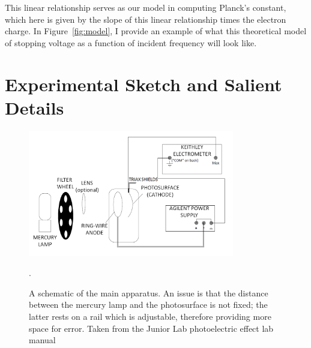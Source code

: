 \documentclass[aps,twocolumn,secnumarabic,balancelastpage,amsmath,amssymb,nofootinbib, floatfix]{revtex4-2}
\begin{document}
This linear relationship serves as our model in computing Planck's constant, which here is given by the slope of this linear relationship times the electron charge. In Figure~\ref{fig:model}, I provide an example of what this theoretical model of stopping voltage as a function of incident frequency will look like. 



\section{Experimental Sketch and Salient Details}

\begin{figure}[H]
	\includegraphics[width=9cm]{apparatus_setup.png}
	\caption{A schematic of the main apparatus. An issue is that the distance between the mercury lamp and the photosurface is not fixed; the latter rests on a rail which is adjustable, therefore providing more space for error. Taken from the Junior Lab photoelectric effect lab manual \cite{photoeffect}}.
	\label{fig:apparat}
\end{figure}
\end{document}
